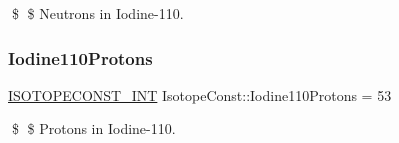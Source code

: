 \$ \$ Neutrons in Iodine-\/110. \mbox{\label{group___isotope_const-_iodine-_i110_gaf1e6abe1dadc6d2c8589e141d32b9b98}} 
\subsubsection{\texorpdfstring{Iodine110\+Protons}{Iodine110Protons}}
{\footnotesize\ttfamily \mbox{\hyperlink{group___isotope_const-_macros_ga5f18360b3e99483a35c32d789e62621c}{I\+S\+O\+T\+O\+P\+E\+C\+O\+N\+S\+T\+\_\+\+I\+NT}} Isotope\+Const\+::\+Iodine110\+Protons = 53}

\$ \$ Protons in Iodine-\/110. 